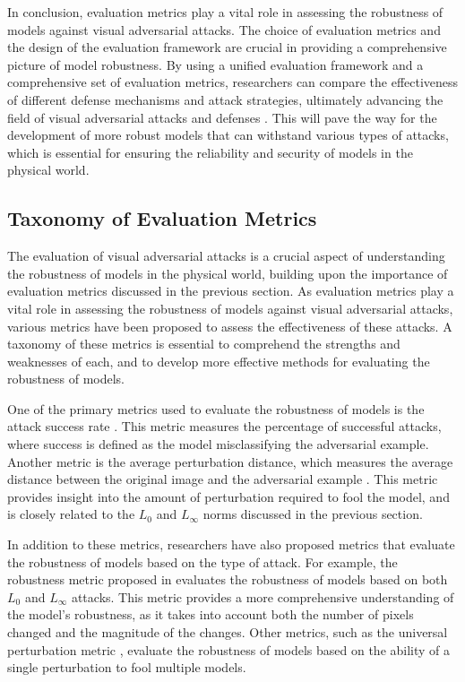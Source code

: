 \documentclass[11pt]{article}
\begin{document}
In conclusion, evaluation metrics play a vital role in assessing the robustness of models against visual adversarial attacks. The choice of evaluation metrics and the design of the evaluation framework are crucial in providing a comprehensive picture of model robustness. By using a unified evaluation framework and a comprehensive set of evaluation metrics, researchers can compare the effectiveness of different defense mechanisms and attack strategies, ultimately advancing the field of visual adversarial attacks and defenses \cite{ref95}. This will pave the way for the development of more robust models that can withstand various types of attacks, which is essential for ensuring the reliability and security of models in the physical world.

\subsection{Taxonomy of Evaluation Metrics}

The evaluation of visual adversarial attacks is a crucial aspect of understanding the robustness of models in the physical world, building upon the importance of evaluation metrics discussed in the previous section. As evaluation metrics play a vital role in assessing the robustness of models against visual adversarial attacks, various metrics have been proposed to assess the effectiveness of these attacks. A taxonomy of these metrics is essential to comprehend the strengths and weaknesses of each, and to develop more effective methods for evaluating the robustness of models.

One of the primary metrics used to evaluate the robustness of models is the attack success rate \cite{ref95}. This metric measures the percentage of successful attacks, where success is defined as the model misclassifying the adversarial example. Another metric is the average perturbation distance, which measures the average distance between the original image and the adversarial example \cite{ref167}. This metric provides insight into the amount of perturbation required to fool the model, and is closely related to the \(L_0\) and \(L_\infty\) norms discussed in the previous section.

In addition to these metrics, researchers have also proposed metrics that evaluate the robustness of models based on the type of attack. For example, the robustness metric proposed in \cite{ref168} evaluates the robustness of models based on both \(L_0\) and \(L_\infty\) attacks. This metric provides a more comprehensive understanding of the model's robustness, as it takes into account both the number of pixels changed and the magnitude of the changes. Other metrics, such as the universal perturbation metric \cite{ref169}, evaluate the robustness of models based on the ability of a single perturbation to fool multiple models.
\end{document}
